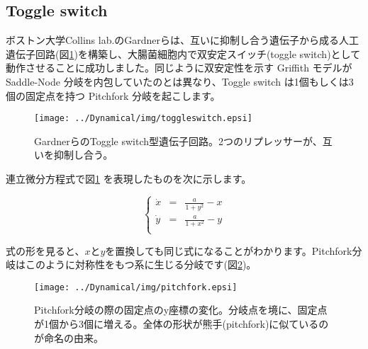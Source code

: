 \subsection{Toggle switch}
ボストン大学Collins lab.のGardnerらは、互いに抑制し合う遺伝子から成る人工遺伝子回路(図\ref{fig:11sysbio})を構築し、大腸菌細胞内で双安定スイッチ(toggle switch)として動作させることに成功しました。同じように双安定性を示す Griffith モデルが Saddle-Node 分岐を内包していたのとは異なり、Toggle switch は1個もしくは3個の固定点を持つ Pitchfork 分岐を起こします。

\begin{figure}[ht]
        \centering \texttt{[image: ../Dynamical/img/toggleswitch.epsi]}
        \caption{GardnerらのToggle switch型遺伝子回路。2つのリプレッサーが、互いを抑制し合う。}
        \label{fig:11sysbio} \end{figure}

連立微分方程式で図\ref{fig:11sysbio} を表現したものを次に示します。

\[
\left\{
\begin{array}{lcl}
\dot x & = & \displaystyle\frac{a}{1+y^2} - x\\
\dot y & = & \displaystyle\frac{a}{1+x^2} - y\\
\end{array}
\right.
\]

式の形を見ると、\(x\)と\(y\)を置換しても同じ式になることがわかります。Pitchfork分岐はこのように対称性をもつ系に生じる分岐です(図\ref{fig:12sysbio})。

\begin{figure}[ht]
        \centering \texttt{[image: ../Dynamical/img/pitchfork.epsi]}
        \caption{Pitchfork分岐の際の固定点のy座標の変化。分岐点を境に、固定点が1個から3個に増える。全体の形状が熊手(pitchfork)に似ているのが命名の由来。}
        \label{fig:12sysbio} \end{figure}


